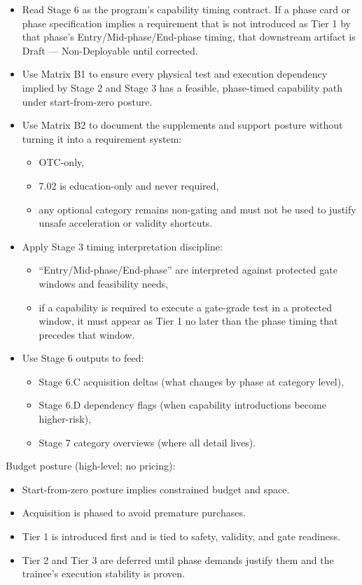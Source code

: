 \documentclass[10pt]{article}
\begin{document}
\begin{itemize}
\item Read Stage 6 as the program’s capability timing contract. If a phase card or phase specification implies a requirement that is not introduced as Tier 1 by that phase’s Entry/Mid-phase/End-phase timing, that downstream artifact is Draft — Non-Deployable until corrected.
\item Use Matrix B1 to ensure every physical test and execution dependency implied by Stage 2 and Stage 3 has a feasible, phase-timed capability path under start-from-zero posture.
\item Use Matrix B2 to document the supplements and support posture without turning it into a requirement system:
  \begin{itemize}
  \item OTC-only,
  \item 7.02 is education-only and never required,
  \item any optional category remains non-gating and must not be used to justify unsafe acceleration or validity shortcuts.
  \end{itemize}
\item Apply Stage 3 timing interpretation discipline:
  \begin{itemize}
  \item “Entry/Mid-phase/End-phase” are interpreted against protected gate windows and feasibility needs,
  \item if a capability is required to execute a gate-grade test in a protected window, it must appear as Tier 1 no later than the phase timing that precedes that window.
  \end{itemize}
\item Use Stage 6 outputs to feed:
  \begin{itemize}
  \item Stage 6.C acquisition deltas (what changes by phase at category level),
  \item Stage 6.D dependency flags (when capability introductions become higher-risk),
  \item Stage 7 category overviews (where all detail lives).
  \end{itemize}
\end{itemize}

Budget posture (high-level; no pricing):

\begin{itemize}
\item Start-from-zero posture implies constrained budget and space.
\item Acquisition is phased to avoid premature purchases.
\item Tier 1 is introduced first and is tied to safety, validity, and gate readiness.
\item Tier 2 and Tier 3 are deferred until phase demands justify them and the trainee’s execution stability is proven.
\end{itemize}
\end{document}
